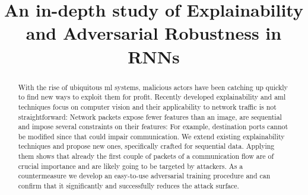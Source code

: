 \documentclass[conference]{IEEEtran}
\begin{document}
\title{An in-depth study of Explainability and Adversarial Robustness in RNNs}

\author{
}




\maketitle%

\thispagestyle{plain}
\pagestyle{plain}


\begin{abstract}

With the rise of ubiquitous \gls{ml} systems, malicious actors have been catching up quickly to find new ways to exploit them for profit. Recently developed explainability and \gls{aml} techniques focus on computer vision and their applicability to network traffic is not straightforward: Network packets expose fewer features than an image, are sequential and impose several constraints on their features: For example, destination ports cannot be modified since that could impair communication. We extend existing explainability techniques and propose new ones, specifically crafted for sequential data. Applying them shows that already the first couple of packets of a communication flow are of crucial importance and are likely going to be targeted by attackers. As a countermeasure we develop an easy-to-use adversarial training procedure and can confirm that it significantly and successfully reduces the attack surface.

\end{abstract}
\end{document}
